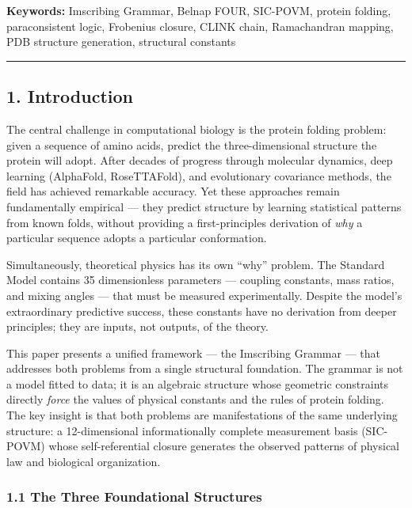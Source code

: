 \documentclass[12pt,a4paper]{article}
\begin{document}
\textbf{Keywords:} Imscribing Grammar, Belnap FOUR, SIC-POVM, protein
folding, paraconsistent logic, Frobenius closure, CLINK chain,
Ramachandran mapping, PDB structure generation, structural constants

\begin{center}\rule{0.5\linewidth}{0.5pt}\end{center}

\hypertarget{introduction}{%
\subsection{1. Introduction}\label{introduction}}

The central challenge in computational biology is the protein folding
problem: given a sequence of amino acids, predict the three-dimensional
structure the protein will adopt. After decades of progress through
molecular dynamics, deep learning (AlphaFold, RoseTTAFold), and
evolutionary covariance methods, the field has achieved remarkable
accuracy. Yet these approaches remain fundamentally empirical --- they
predict structure by learning statistical patterns from known folds,
without providing a first-principles derivation of \emph{why} a
particular sequence adopts a particular conformation.

Simultaneously, theoretical physics has its own ``why'' problem. The
Standard Model contains 35 dimensionless parameters --- coupling
constants, mass ratios, and mixing angles --- that must be measured
experimentally. Despite the model's extraordinary predictive success,
these constants have no derivation from deeper principles; they are
inputs, not outputs, of the theory.

This paper presents a unified framework --- the Imscribing Grammar ---
that addresses both problems from a single structural foundation. The
grammar is not a model fitted to data; it is an algebraic structure
whose geometric constraints directly \emph{force} the values of physical
constants and the rules of protein folding. The key insight is that both
problems are manifestations of the same underlying structure: a
12-dimensional informationally complete measurement basis (SIC-POVM)
whose self-referential closure generates the observed patterns of
physical law and biological organization.

\hypertarget{the-three-foundational-structures}{%
\subsubsection{1.1 The Three Foundational
Structures}\label{the-three-foundational-structures}}
\end{document}
